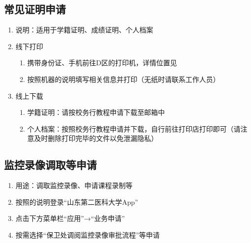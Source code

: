 \subsection[常见证明申请]{常见证明申请}
\begin{enumerate}
    \item 说明：适用于学籍证明\footnotemark、成绩证明、个人档案
    \item 线下打印
          \begin{enumerate}
              \item 携带身份证、手机前往D区的打印机，详情位置见
              \item 按照机器的说明填写相关信息并打印（无纸时请联系工作人员）
          \end{enumerate}
    \item 线上下载
          \begin{enumerate}
              \item 学籍证明：请按校务行教程申请下载至邮箱中
              \item 个人档案：按照校务行教程申请并下载，自行前往打印店打印即可（请注意及时删除打印完毕的文件以免泄漏隐私）
          \end{enumerate}
\end{enumerate}

\subsection[监控录像调取等申请]{监控录像调取等申请}
\label{surveillance_video}
\begin{enumerate}
    \item 用途：调取监控录像、申请课程录制等
    \item 按照的说明登录“山东第二医科大学App”
    \item 点击下方菜单栏“应用”→“业务申请”
    \item 按需选择“保卫处调阅监控录像审批流程”等申请
\end{enumerate}

